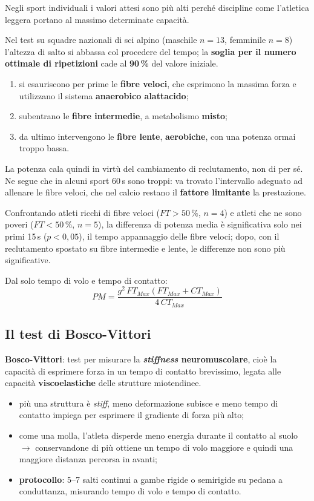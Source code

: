 \noindent Negli sport individuali i valori attesi sono più alti perché discipline come l'atletica
leggera portano al massimo determinate capacità.

Nel test su squadre nazionali di sci alpino (maschile $n = 13$, femminile $n = 8$) l'altezza di
salto si abbassa col procedere del tempo; la \textbf{soglia per il numero ottimale di ripetizioni}
cade al \textbf{90\,\%} del valore iniziale.
\begin{enumerate}
  \item si esauriscono per prime le \textbf{fibre veloci}, che esprimono la massima forza e
    utilizzano il sistema \textbf{anaerobico alattacido};
  \item subentrano le \textbf{fibre intermedie}, a metabolismo \textbf{misto};
  \item da ultimo intervengono le \textbf{fibre lente}, \textbf{aerobiche}, con una potenza ormai
    troppo bassa.
\end{enumerate}
La potenza cala quindi in virtù del cambiamento di reclutamento, non di per sé. Ne segue
che in alcuni sport 60\,s sono troppi: va trovato l'intervallo adeguato ad allenare le fibre
veloci, che nel calcio restano il \textbf{fattore limitante} la prestazione.

Confrontando atleti ricchi di fibre veloci ($FT > 50\,\%$, $n = 4$) e atleti che ne sono poveri ($FT
  < 50\,\%$, $n = 5$), la differenza di potenza media è significativa solo nei primi 15\,s ($p <
  0,05$), il tempo appannaggio delle fibre veloci; dopo, con il reclutamento spostato su fibre
  intermedie e lente, le differenze non sono più significative.

Dal solo tempo di volo e tempo di contatto:
\[ PM = \frac{g^2 \, FT_{Max} (FT_{Max} + CT_{Max})}{4 \, CT_{Max}} \]

\subsection{Il test di Bosco-Vittori}

\textbf{Bosco-Vittori}: test per misurare la \textbf{\textit{stiffness} neuromuscolare}, cioè la
  capacità di esprimere forza in un tempo di contatto brevissimo, legata alle capacità
  \textbf{viscoelastiche} delle strutture miotendinee.

\begin{itemize}
  \item più una struttura è \textit{stiff}, meno deformazione subisce e meno tempo di contatto
    impiega per esprimere il gradiente di forza più alto;
  \item come una molla, l'atleta disperde meno energia durante il contatto al suolo $\rightarrow$
    conservandone di più ottiene un tempo di volo maggiore e quindi una maggiore distanza percorsa
    in avanti;
  \item \textbf{protocollo}: 5--7 salti continui a gambe rigide o semirigide su pedana a
    conduttanza, misurando tempo di volo e tempo di contatto.
\end{itemize}

